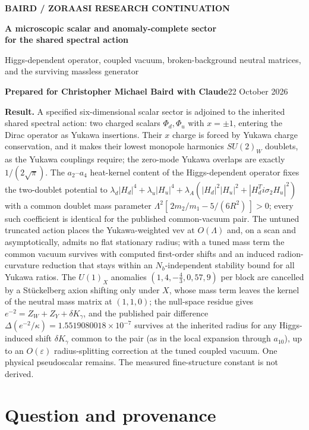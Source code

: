 \documentclass[11pt,letterpaper]{article}
\begin{document}
\thispagestyle{plain}
{\small\color{teal}\textbf{BAIRD / ZORAASI RESEARCH CONTINUATION}}

{\LARGE\bfseries\color{navy} A microscopic scalar and anomaly-complete sector\\[3pt] for the shared spectral action}

{\large Higgs-dependent operator, coupled vacuum, broken-background neutral matrices, and the surviving massless generator}

\textbf{Prepared for Christopher Michael Baird with Claude}\hfill 22 October 2026

\colorbox{pale}{\parbox{\dimexpr\linewidth-2\fboxsep\relax}{\textbf{Result.} A specified six-dimensional scalar sector is adjoined to the inherited shared spectral action: two charged scalars $\Phi_d,\Phi_u$ with $x=\pm1$, entering the Dirac operator as Yukawa insertions. Their $x$ charge is forced by Yukawa charge conservation, and it makes their lowest monopole harmonics $SU(2)_W$ doublets, as the Yukawa couplings require; the zero-mode Yukawa overlaps are exactly $1/(2\sqrt\pi)$. The $a_2$--$a_4$ heat-kernel content of the Higgs-dependent operator fixes the two-doublet potential to $\lambda_d|H_d|^4+\lambda_u|H_u|^4+\lambda_A(|H_d|^2|H_u|^2+|H_d^{T}i\sigma_2H_u|^2)$ with a common doublet mass parameter $\Lambda^2[\,2m_2/m_1-5/(6R^2)\,]>0$; every such coefficient is identical for the published common-vacuum pair. The untuned truncated action places the Yukawa-weighted vev at $O(\Lambda)$ and, on a scan and asymptotically, admits no flat stationary radius; with a tuned mass term the common vacuum survives with computed first-order shifts and an induced radion-curvature reduction that stays within an $N_b$-independent stability bound for all Yukawa ratios. The $U(1)_X$ anomalies $(1,4,-\tfrac43,0,57,9)$ per block are cancelled by a Stückelberg axion shifting only under $X$, whose mass term leaves the kernel of the neutral mass matrix at $(1,1,0)$; the null-space residue gives $e^{-2}=Z_W+Z_Y+\delta K_\gamma$, and the published pair difference $\Delta(e^{-2}/\kappa)=1.5519080018\times10^{-7}$ survives at the inherited radius for any Higgs-induced shift $\delta K_\gamma$ common to the pair (as in the local expansion through $a_{10}$), up to an $O(\varepsilon)$ radius-splitting correction at the tuned coupled vacuum. One physical pseudoscalar remains. The measured fine-structure constant is not derived.}}

\section{Question and provenance}
\end{document}
